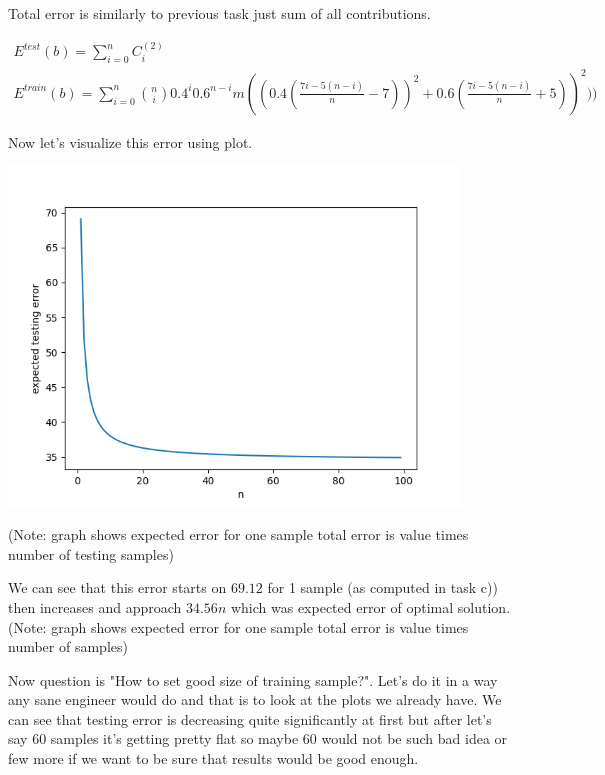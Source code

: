 \documentclass[a4paper]{article}
\begin{document}
Total error is similarly to previous task just sum of all contributions.

\begin{align*}
	E^{test}(b) = \sum_{i=0}^{n} C_i^{(2)}
	\\
	E^{train}(b) = \sum_{i=0}^{n} \binom{n}{i}0.4^i0.6^{n-i}m((0.4(\frac{7i-5(n-i)}{n}-7))^2 + 0.6(\frac{7i-5(n-i)}{n}+5))^2))
\end{align*}

Now let's visualize this error using plot.

\centerline{\includegraphics[width=0.9\textwidth]{testing_error}}
(Note: graph shows expected error for one sample total error is value times number of testing samples)

We can see that this error starts on $69.12$ for 1 sample (as computed in task c)) then increases and approach $34.56n$ which was expected error of optimal solution.
(Note: graph shows expected error for one sample total error is value times number of samples)

Now question is "How to set good size of training sample?". Let's do it in a way any sane engineer would do and that is to look at the plots we already have. We can see that testing error is decreasing quite significantly at first but after let's say 60 samples it's getting pretty flat so maybe 60 would not be such bad idea or few more if we want to be sure that results would be good enough.
\end{document}
